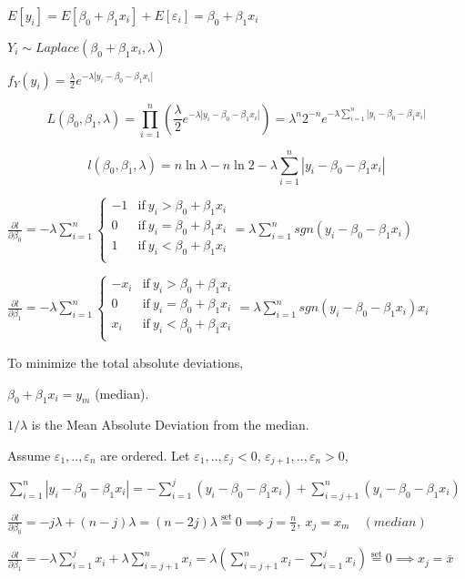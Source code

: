 \documentclass[12pt,]{article}
\begin{document}
\(E[y_i]=E[\beta_0+\beta_1x_i]+E[\varepsilon_i]=\beta_0+\beta_1x_i\)

\(Y_i\sim Laplace(\beta_0+\beta_1x_i,\lambda)\)

\(f_Y(y_i)=\frac{\lambda}{ 2}e^{-\lambda|y_i-\beta_0-\beta_1x_i|}\)

\[L(\beta_0,\beta_1,\lambda)=\prod_{i=1}^{n}(\frac{\lambda}{ 2}e^{-\lambda|y_i-\beta_0-\beta_1x_i|})=\lambda^n2^{-n}e^{-\lambda\sum_{i=1}^{n}|y_i-\beta_0-\beta_1x_i|}\]

\[l(\beta_0,\beta_1,\lambda)=n\ln\lambda-n\ln2-\lambda\sum_{i=1}^{n}|y_i-\beta_0-\beta_1x_i|\]

\(\frac{\partial l}{\partial\beta_0}=-\lambda\sum_{i=1}^{n}\begin{cases}-1&\text{if}\ y_i>\beta_0+\beta_1x_i\\0&\text{if}\ y_i=\beta_0+\beta_1x_i\\1&\text{if}\ y_i<\beta_0+\beta_1x_i\\\end{cases}=\lambda\sum_{i=1}^{n}sgn(y_i-\beta_0-\beta_1x_i)\)

\(\frac{\partial l}{\partial\beta_1}=-\lambda\sum_{i=1}^{n}\begin{cases}-x_i&\text{if}\ y_i>\beta_0+\beta_1x_i\\0&\text{if}\ y_i=\beta_0+\beta_1x_i\\x_i&\text{if}\ y_i<\beta_0+\beta_1x_i\\\end{cases}=\lambda\sum_{i=1}^{n}sgn(y_i-\beta_0-\beta_1x_i)x_i\)

To minimize the total absolute deviations,

\(\beta_0+\beta_1x_i=y_m\) (median).

\(1/\lambda\) is the Mean Absolute Deviation from the median.

Assume \(\varepsilon_1,..,\varepsilon_n\) are ordered. Let
\(\varepsilon_1,..,\varepsilon_j<0\),
\(\varepsilon_{j+1},..,\varepsilon_n>0\),

\(\sum_{i=1}^{n}|y_i-\beta_0-\beta_1x_i|=-\sum_{i=1}^{j}(y_i-\beta_0-\beta_1x_i)+\sum_{i=j+1}^{n}(y_i-\beta_0-\beta_1x_i)\)

\(\frac{\partial l}{\partial\beta_0}=-j\lambda+(n-j)\lambda=(n-2j)\lambda\overset{\text{set}}{=}0\implies j=\frac{n}2,\ x_j=x_{m}\quad(median)\)

\(\frac{\partial l}{\partial\beta_1}=-\lambda\sum_{i=1}^{j}x_i+\lambda\sum_{i=j+1}^{n}x_i=\lambda(\sum_{i=j+1}^{n}x_i-\sum_{i=1}^{j}x_i)\overset{\text{set}}{=}0\implies x_j=\bar x\)
\end{document}
